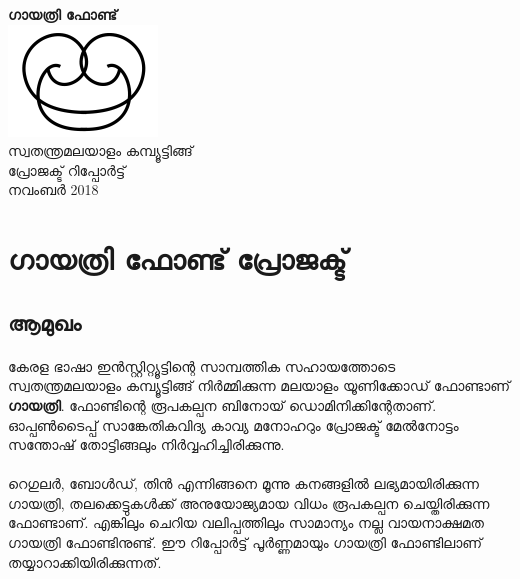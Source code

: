 \documentclass[12pt]{article}
\begin{document}
	
\begin{titlepage}
	\begin{center}
		\Large{{\textbf{ഗായത്രി ഫോണ്ട്}}}\\[2cm]

		\includegraphics[scale=0.5]{logo.png}\\[0.5cm]	
		
		\textsc{\Large {സ്വതന്ത്രമലയാളം കമ്പ്യൂട്ടിങ്ങ്}}~\\[4cm]
		{\textsc{\Large {പ്രോജക്ട് റിപ്പോര്‍ട്ട്}}}\\
		നവംബര്‍ 2018
	\end{center}
\end{titlepage}
 

	
	
	
	\section{ഗായത്രി ഫോണ്ട് പ്രോജക്ട്}
	
	\subsection{ആമുഖം}
	
	\paragraph{}
	കേരള ഭാഷാ ഇന്‍സ്റ്റിറ്റ്യൂട്ടിന്റെ സാമ്പത്തിക സഹായത്തോടെ സ്വതന്ത്രമലയാളം കമ്പ്യൂട്ടിങ്ങ് നിര്‍മ്മിക്കുന്ന മലയാളം യൂണിക്കോഡ് ഫോണ്ടാണ് \textbf{ഗായത്രി}. ഫോണ്ടിന്റെ രൂപകല്പന ബിനോയ് ഡൊമിനിക്കിന്റേതാണ്. ഓപ്പണ്‍ടൈപ്പ് സാങ്കേതികവിദ്യ കാവ്യ മനോഹറും പ്രോജക്ട് മേല്‍നോട്ടം സന്തോഷ് തോട്ടിങ്ങലും നിര്‍വ്വഹിച്ചിരിക്കുന്നു.
	
	\paragraph{}
	റെഗുലര്‍, ബോള്‍ഡ്, തിന്‍ എന്നിങ്ങനെ മൂന്നു കനങ്ങളില്‍ ലഭ്യമായിരിക്കുന്ന ഗായത്രി, തലക്കെട്ടുകള്‍ക്ക് അനുയോജ്യമായ വിധം രൂപകല്പന ചെയ്തിരിക്കുന്ന ഫോണ്ടാണ്. എങ്കിലും ചെറിയ വലിപ്പത്തിലും സാമാന്യം നല്ല വായനാക്ഷമത ഗായത്രി ഫോണ്ടിനുണ്ട്. ഈ റിപ്പോര്‍ട്ട് പൂര്‍ണ്ണമായും ഗായത്രി ഫോണ്ടിലാണ് തയ്യാറാക്കിയിരിക്കുന്നത്.
	
\end{document}
